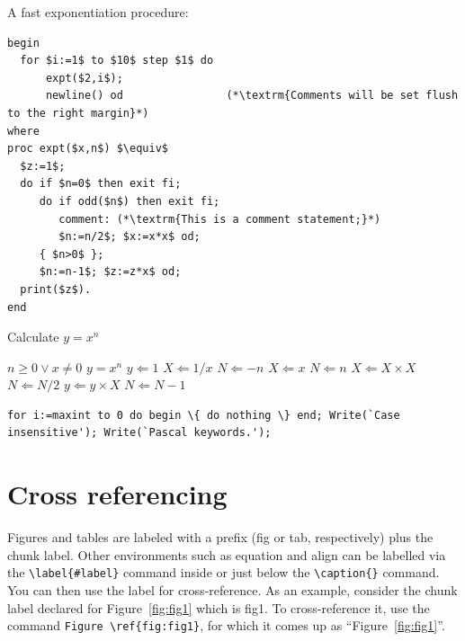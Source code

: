 \documentclass[sn-basic,pdflatex]{sn-jnl}
\theoremstyle{remark}
\theoremstyle{definition}
\begin{document}
A fast exponentiation procedure:

\begin{lstlisting}
begin
  for $i:=1$ to $10$ step $1$ do
      expt($2,i$);  
      newline() od                (*\textrm{Comments will be set flush to the right margin}*)
where
proc expt($x,n$) $\equiv$
  $z:=1$;
  do if $n=0$ then exit fi;
     do if odd($n$) then exit fi;                 
        comment: (*\textrm{This is a comment statement;}*)
        $n:=n/2$; $x:=x*x$ od;
     { $n>0$ };
     $n:=n-1$; $z:=z*x$ od;
  print($z$). 
end
\end{lstlisting}

\begin{algorithm}
\caption{Calculate $y = x^n$}\label{algo1}
\begin{algorithmic}[1]
\Require $n \geq 0 \vee x \neq 0$
\Ensure $y = x^n$ 
\State $y \Leftarrow 1$
\label{algln2}
        \State $X \Leftarrow 1 / x$
        \State $N \Leftarrow -n$
\Else
        \State $X \Leftarrow x$
        \State $N \Leftarrow n$
\EndIf
{}
            \State $X \Leftarrow X \times X$
            \State $N \Leftarrow N / 2$
        \Else[$N$ is odd]
            \State $y \Leftarrow y \times X$
            \State $N \Leftarrow N - 1$
        \EndIf
\EndWhile
\end{algorithmic}
\end{algorithm}

\begin{minipage}{\hsize}

\lstset{frame=single,framexleftmargin=-1pt,framexrightmargin=-17pt,framesep=12pt,linewidth=0.98\textwidth,language=pascal}

\begin{lstlisting}
for i:=maxint to 0 do begin \{ do nothing \} end; Write(`Case
insensitive'); Write(`Pascal keywords.');

\end{lstlisting}

\end{minipage}

\section{Cross referencing}\label{sec8}

Figures and tables are labeled with a prefix (fig or tab, respectively)
plus the chunk label. Other environments such as equation and align can
be labelled via the \texttt{\textbackslash{}label\{\#label\}} command
inside or just below the \texttt{\textbackslash{}caption\{\}} command.
You can then use the label for cross-reference. As an example, consider
the chunk label declared for Figure~\ref{fig:fig1} which is fig1. To
cross-reference it, use the command
\texttt{Figure\ \textbackslash{}ref\{fig:fig1\}}, for which it comes up
as ``Figure~\ref{fig:fig1}''.
\end{document}
